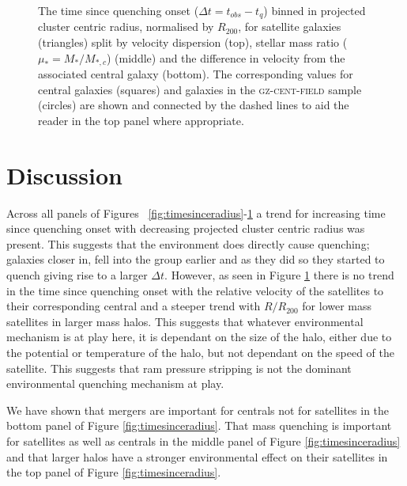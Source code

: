 \begin{figure}
{\caption[The time since quenching of the \textsc{gz-group} sample with projected cluster centric radius]{The time since quenching onset ($\Delta t = t_{obs} - t_{q}$) binned in projected cluster centric radius, normalised by $R_{200}$, for satellite galaxies (triangles) split by velocity dispersion (top), stellar mass ratio ($\mu_* = M_*/M_{*,c}$) (middle) and the difference in velocity from the associated central galaxy (bottom). The corresponding values for central galaxies (squares) and galaxies in the \textsc{gz-cent-field} sample (circles) are shown and connected by the dashed lines to aid the reader in the top panel where appropriate.}
\label{fig:timesinceradiusvel}}
\end{figure}


\section{Discussion}\label{sec:disc}

Across all panels of Figures ~\ref{fig:timesinceradius}-\ref{fig:timesinceradiusvel} a trend for increasing time since quenching onset with decreasing projected cluster centric radius was present. This suggests that the environment does directly cause quenching; galaxies closer in, fell into the group earlier and as they did so they started to quench giving rise to a larger $\Delta t$. However, as seen in Figure \ref{fig:timesinceradiusvel} there is no trend in the time since quenching onset with the relative velocity of the satellites to their corresponding central and a steeper trend with $R/R_{200}$ for lower mass satellites in larger mass halos. This suggests that whatever environmental mechanism is at play here, it is dependant on the size of the halo, either due to the potential or temperature of the halo, but not dependant on the speed of the satellite. This suggests that ram pressure stripping is not the dominant environmental quenching mechanism at play. 

We have shown that mergers are important for centrals not for satellites in the bottom panel of Figure \ref{fig:timesinceradius}. That mass quenching is important for satellites as well as centrals in the middle panel of Figure \ref{fig:timesinceradius} and that larger halos have a stronger environmental effect on their satellites in the top panel of Figure \ref{fig:timesinceradius}. 

